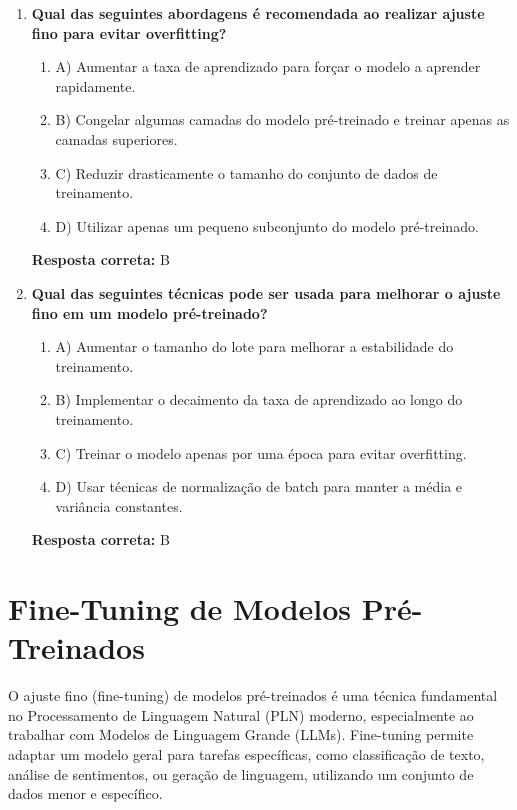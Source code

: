 \documentclass[14pt,a4paper,oneside]{book}
\begin{document}
\begin{enumerate}
	\item \textbf{Qual das seguintes abordagens é recomendada ao realizar ajuste fino para evitar overfitting?}
	\begin{enumerate}[label=\alph*)]
		\item A) Aumentar a taxa de aprendizado para forçar o modelo a aprender rapidamente.
		\item B) Congelar algumas camadas do modelo pré-treinado e treinar apenas as camadas superiores.
		\item C) Reduzir drasticamente o tamanho do conjunto de dados de treinamento.
		\item D) Utilizar apenas um pequeno subconjunto do modelo pré-treinado.
	\end{enumerate}
	\vspace{5mm}
	\textbf{Resposta correta:} B
	
	\item \textbf{Qual das seguintes técnicas pode ser usada para melhorar o ajuste fino em um modelo pré-treinado?}
	\begin{enumerate}[label=\alph*)]
		\item A) Aumentar o tamanho do lote para melhorar a estabilidade do treinamento.
		\item B) Implementar o decaimento da taxa de aprendizado ao longo do treinamento.
		\item C) Treinar o modelo apenas por uma época para evitar overfitting.
		\item D) Usar técnicas de normalização de batch para manter a média e variância constantes.
	\end{enumerate}
	\vspace{5mm}
	\textbf{Resposta correta:} B
	
\end{enumerate}


\chapter{Fine-Tuning de Modelos Pré-Treinados}

O ajuste fino (fine-tuning) de modelos pré-treinados é uma técnica fundamental no Processamento de Linguagem Natural (PLN) moderno, especialmente ao trabalhar com Modelos de Linguagem Grande (LLMs). Fine-tuning permite adaptar um modelo geral para tarefas específicas, como classificação de texto, análise de sentimentos, ou geração de linguagem, utilizando um conjunto de dados menor e específico.
\end{document}
